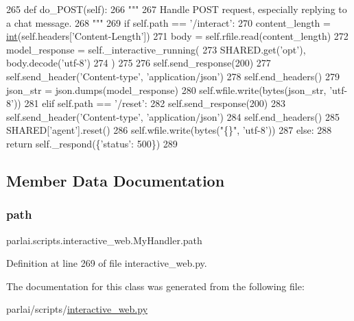 \begin{DoxyCode}
265     \textcolor{keyword}{def }do\_POST(self):
266         \textcolor{stringliteral}{"""}
267 \textcolor{stringliteral}{        Handle POST request, especially replying to a chat message.}
268 \textcolor{stringliteral}{        """}
269         \textcolor{keywordflow}{if} self.path == \textcolor{stringliteral}{'/interact'}:
270             content\_length = \hyperlink{namespacelanguage__model_1_1eval__ppl_a7d12ee00479673c5c8d1f6d01faa272a}{int}(self.headers[\textcolor{stringliteral}{'Content-Length'}])
271             body = self.rfile.read(content\_length)
272             model\_response = self.\_interactive\_running(
273                 SHARED.get(\textcolor{stringliteral}{'opt'}), body.decode(\textcolor{stringliteral}{'utf-8'})
274             )
275 
276             self.send\_response(200)
277             self.send\_header(\textcolor{stringliteral}{'Content-type'}, \textcolor{stringliteral}{'application/json'})
278             self.end\_headers()
279             json\_str = json.dumps(model\_response)
280             self.wfile.write(bytes(json\_str, \textcolor{stringliteral}{'utf-8'}))
281         \textcolor{keywordflow}{elif} self.path == \textcolor{stringliteral}{'/reset'}:
282             self.send\_response(200)
283             self.send\_header(\textcolor{stringliteral}{'Content-type'}, \textcolor{stringliteral}{'application/json'})
284             self.end\_headers()
285             SHARED[\textcolor{stringliteral}{'agent'}].reset()
286             self.wfile.write(bytes(\textcolor{stringliteral}{"\{\}"}, \textcolor{stringliteral}{'utf-8'}))
287         \textcolor{keywordflow}{else}:
288             \textcolor{keywordflow}{return} self.\_respond(\{\textcolor{stringliteral}{'status'}: 500\})
289 
\end{DoxyCode}


\subsection{Member Data Documentation}
\mbox{\label{classparlai_1_1scripts_1_1interactive__web_1_1MyHandler_ac1cd1a67cc1ed03620292e70d41125a0}} 
\subsubsection{\texorpdfstring{path}{path}}
{\footnotesize\ttfamily parlai.\+scripts.\+interactive\+\_\+web.\+My\+Handler.\+path}



Definition at line 269 of file interactive\+\_\+web.\+py.



The documentation for this class was generated from the following file\+:\begin{DoxyCompactItemize}
\item 
parlai/scripts/\hyperlink{interactive__web_8py}{interactive\+\_\+web.\+py}\end{DoxyCompactItemize}

